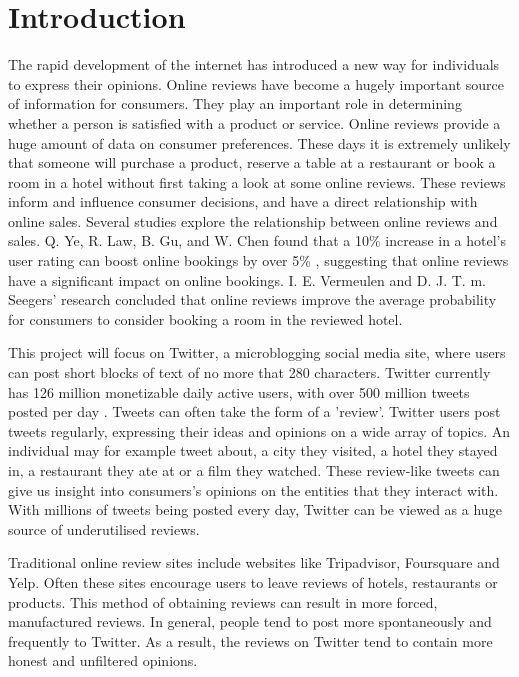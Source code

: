 \chapter{Introduction}
\begin{justify}
The rapid development of the internet has introduced a new way for individuals to express their opinions. Online reviews have become a hugely important source of information for consumers. They play an important role in determining whether a person is satisfied with a product or service. Online reviews provide a huge amount of data on consumer preferences. These days it is extremely unlikely that someone will purchase a product, reserve a table at a restaurant or book a room in a hotel without first taking a look at some online reviews. These reviews inform and influence consumer decisions, and have a direct relationship with online sales. Several studies explore the relationship between online reviews and sales. Q. Ye, R. Law, B. Gu, and W. Chen found that a 10\% increase in a hotel's user rating can boost online bookings by over 5\% \cite{HotelSales2011}, suggesting that online reviews have a significant impact on online bookings. I. E. Vermeulen and D. J. T. m. Seegers' \cite{Vermeulen2009} research concluded that online reviews improve the average probability for consumers to consider booking a room in the reviewed hotel. 
\end{justify}

This project will focus on Twitter, a microblogging social media site, where users can post short blocks of text of no more that 280 characters. Twitter currently has 126 million monetizable daily active users, with over 500 million tweets posted per day \cite{Twitter2019}. Tweets can often take the form of a 'review'. Twitter users post tweets regularly, expressing their ideas and opinions on a wide array of topics. An individual may for example tweet about, a city they visited, a hotel they stayed in, a restaurant they ate at or a film they watched. These review-like tweets can give us insight into consumers’s opinions on the entities that they interact with. With millions of tweets being posted every day, Twitter can be viewed as a huge source of underutilised reviews.

Traditional online review sites include websites like Tripadvisor, Foursquare and Yelp. Often these sites encourage users to leave reviews of hotels, restaurants or products. This method of obtaining reviews can result in more forced, manufactured reviews. In general, people tend to post more spontaneously and frequently to Twitter. As a result, the reviews on Twitter tend to contain more honest and unfiltered opinions. 

